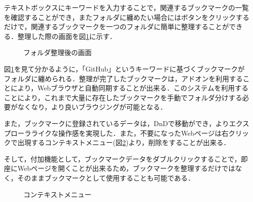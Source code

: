 \documentclass[a4paper,10pt,fleqn]{jsarticle}
\begin{document}
テキストボックスにキーワードを入力することで，関連するブックマークの一覧を確認することができ，またフォルダに纏めたい場合にはボタンをクリックするだけで，関連するブックマークを一つのフォルダに簡単に整理することができる．整理した際の画面を図\ref{fig:prot3}に示す．

\begin{figure}[h]
  \begin{center}
    \caption{フォルダ整理後の画面}
    \label{fig:prot3}
  \end{center}
\end{figure}

\newpage

図\ref{fig:prot3}を見て分かるように，「GitHub」というキーワードに基づくブックマークがフォルダに纏められる．整理が完了したブックマークは，アドオンを利用することにより，Webブラウザと自動同期することが出来る．このシステムを利用することにより，これまで大量に存在したブックマークを手動でフォルダ分けする必要がなくなり，より良いブラウジングが可能となる．

また，ブックマークに登録されているデータは，DnDで移動ができ，よりエクスプローラライクな操作感を実現した．また，不要になったWebページは右クリックで出現するコンテキストメニュー(図\ref{fig:prot4})より，削除をすることが出来る．

そして，付加機能として，ブックマークデータをダブルクリックすることで，即座にWebページを開くことが出来るため，ブックマークを整理するだけではなく，そのままブックマークとして使用することも可能である．

\begin{figure}[h]
  \begin{center}
    \caption{コンテキストメニュー}
    \label{fig:prot4}
  \end{center}
\end{figure}
\end{document}
